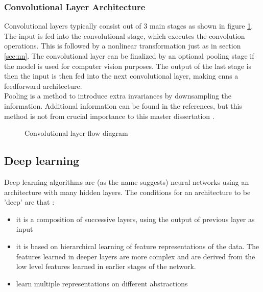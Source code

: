 \subsubsection*{Convolutional Layer Architecture}
Convolutional layers typically consist out of 3 main stages as shown in figure \ref{fig:cnn}. The input is fed into the convolutional stage, which executes the convolution operations. This is followed by a nonlinear transformation just as in section \ref{sec:nn}. The convolutional layer can be finalized by an optional pooling stage if the model is used for computer vision purposes. The output of the last stage is then the input is then fed into the next convolutional layer, making \gls{cnn}s a feedforward architecture.\\
Pooling is a method to introduce extra invariances by downsampling the information. Additional information can be found in the references, but this method is not from crucial importance to this master dissertation \cite{boureau11}.\\

\begin{figure}
\centering
{}
\caption{Convolutional layer flow diagram}
\label{fig:cnn}
\end{figure}

\subsection{Deep learning}
\label{subsubsec:dl}
Deep learning algorithms are (as the name suggests) neural networks using an architecture with many hidden layers. The conditions for an architecture to be 'deep' are that \cite{deng14}:
\begin{itemize}
\item it is a composition of successive layers, using the output of previous layer as input
\item it is based on hierarchical learning of feature representations of the data. The features learned in deeper layers are more complex and are derived from the low level features learned in earlier stages of the network.
\item learn multiple representations on different abstractions
\end{itemize}

